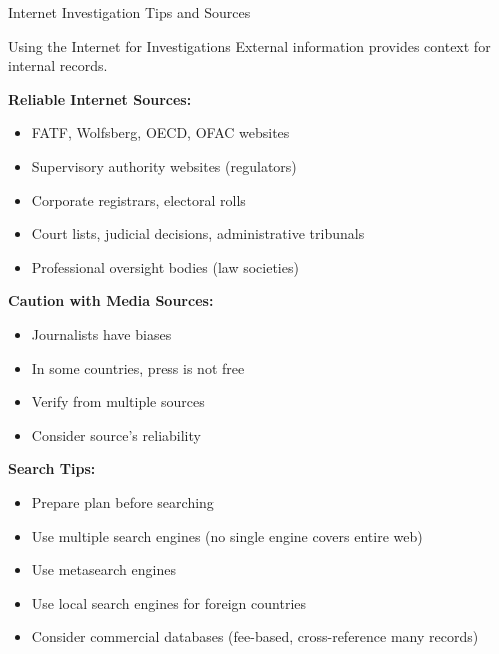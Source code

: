 \documentclass[11pt,a4paper]{beamer}
\begin{document}
	\begin{frame}{Internet Investigation Tips and Sources}
		\begin{block}{Using the Internet for Investigations}
			External information provides context for internal records.
		\end{block}
		\textbf{Reliable Internet Sources:}
		\begin{itemize}
			\item FATF, Wolfsberg, OECD, OFAC websites
			\item Supervisory authority websites (regulators)
			\item Corporate registrars, electoral rolls
			\item Court lists, judicial decisions, administrative tribunals
			\item Professional oversight bodies (law societies)
		\end{itemize}
		\textbf{Caution with Media Sources:}
		\begin{itemize}
			\item Journalists have biases
			\item In some countries, press is not free
			\item Verify from multiple sources
			\item Consider source's reliability
		\end{itemize}
		\textbf{Search Tips:}
		\begin{itemize}
			\item Prepare plan before searching
			\item Use multiple search engines (no single engine covers entire web)
			\item Use metasearch engines
			\item Use local search engines for foreign countries
			\item Consider commercial databases (fee-based, cross-reference many records)
		\end{itemize}
	\end{frame}
	
	
\end{document}
